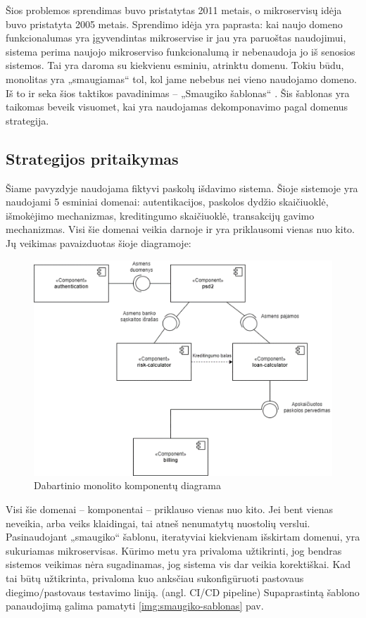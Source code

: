 \documentclass[fleqn]{VUMIFPSkursinis}
\begin{document}
Šios problemos sprendimas buvo pristatytas 2011 metais, o mikroservisų idėja buvo pristatyta 2005 metais. Sprendimo idėja yra paprasta: kai naujo domeno funkcionalumas yra įgyvendintas mikroservise ir jau yra paruoštas naudojimui, sistema perima naujojo mikroserviso funkcionalumą ir nebenaudoja jo iš senosios sistemos. Tai yra daroma su kiekvienu esminiu, atrinktu domenu. Tokiu būdu, monolitas yra „smaugiamas“ tol, kol jame nebebus nei vieno naudojamo domeno. Iš to ir seka šios taktikos pavadinimas – „Smaugiko šablonas“ \cite{Beh18}. Šis šablonas yra taikomas beveik visuomet, kai yra naudojamas dekomponavimo pagal domenus strategija.

\subsection{Strategijos pritaikymas}
Šiame pavyzdyje naudojama fiktyvi paskolų išdavimo sistema. Šioje sistemoje yra naudojami 5 esminiai domenai: autentikacijos, paskolos dydžio skaičiuoklė, išmokėjimo mechanizmas, kreditingumo skaičiuoklė, transakcijų gavimo mechanizmas. Visi šie domenai veikia darnoje ir yra priklausomi vienas nuo kito. Jų veikimas pavaizduotas šioje diagramoje:
\begin{figure}[H]
    \centering
    \includegraphics[scale=0.9]{img/komponentu-diagrama.png}
    \caption{Dabartinio monolito komponentų diagrama}
    \label{img:komponentu-diagrama}
\end{figure}

Visi šie domenai – komponentai – priklauso vienas nuo kito. Jei bent vienas neveikia, arba veiks klaidingai, tai atneš nenumatytų nuostolių verslui. Pasinaudojant „smaugiko“ šablonu, iteratyviai kiekvienam išskirtam domenui, yra sukuriamas mikroservisas. Kūrimo metu yra privaloma užtikrinti, jog bendras sistemos veikimas nėra sugadinamas, jog sistema vis dar veikia korektiškai. Kad tai būtų užtikrinta, privaloma kuo anksčiau sukonfigūruoti pastovaus diegimo/pastovaus testavimo liniją. (angl. CI/CD pipeline)  Supaprastintą šablono panaudojimą galima pamatyti \ref{img:smaugiko-sablonas} pav.
\end{document}
